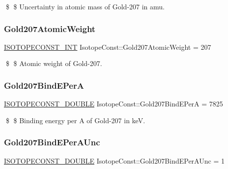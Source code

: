 \$ \$ Uncertainty in atomic mass of Gold-\/207 in amu. \mbox{\label{group___isotope_const-_gold-_au207_gae40a2a94ea5c21a95b56f222ecaa6cfb}} 
\subsubsection{\texorpdfstring{Gold207\+Atomic\+Weight}{Gold207AtomicWeight}}
{\footnotesize\ttfamily \mbox{\hyperlink{group___isotope_const-_macros_ga5f18360b3e99483a35c32d789e62621c}{I\+S\+O\+T\+O\+P\+E\+C\+O\+N\+S\+T\+\_\+\+I\+NT}} Isotope\+Const\+::\+Gold207\+Atomic\+Weight = 207}

\$ \$ Atomic weight of Gold-\/207. \mbox{\label{group___isotope_const-_gold-_au207_gabdaa5ca1a8915680c9efff11c3d6a35f}} 
\subsubsection{\texorpdfstring{Gold207\+Bind\+E\+PerA}{Gold207BindEPerA}}
{\footnotesize\ttfamily \mbox{\hyperlink{group___isotope_const-_macros_ga8f45a7272ce02c0b4c65c44636ed719a}{I\+S\+O\+T\+O\+P\+E\+C\+O\+N\+S\+T\+\_\+\+D\+O\+U\+B\+LE}} Isotope\+Const\+::\+Gold207\+Bind\+E\+PerA = 7825}

\$ \$ Binding energy per A of Gold-\/207 in keV. \mbox{\label{group___isotope_const-_gold-_au207_ga466e0dc6c68bb804122a4767d4aec96d}} 
\subsubsection{\texorpdfstring{Gold207\+Bind\+E\+Per\+A\+Unc}{Gold207BindEPerAUnc}}
{\footnotesize\ttfamily \mbox{\hyperlink{group___isotope_const-_macros_ga8f45a7272ce02c0b4c65c44636ed719a}{I\+S\+O\+T\+O\+P\+E\+C\+O\+N\+S\+T\+\_\+\+D\+O\+U\+B\+LE}} Isotope\+Const\+::\+Gold207\+Bind\+E\+Per\+A\+Unc = 1}

